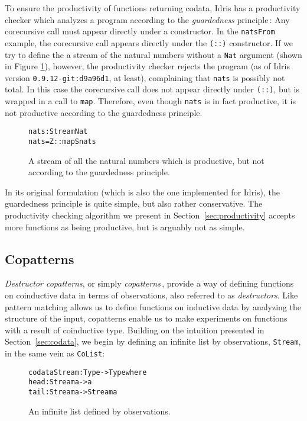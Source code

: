 To ensure the productivity of functions returning codata, Idris has a productivity checker which analyzes a program according to the \emph{guardedness} principle\,\citep{Coquand94,Gimenez95}: Any corecursive call must appear directly under a constructor. In the \texttt{natsFrom} example, the corecursive call appears directly under the \texttt{(::)} constructor. If we try to define the a stream of the natural numbers without a \texttt{Nat} argument (shown in Figure \ref{fig:nats}), however, the productivity checker rejects the program (as of Idris version \texttt{0.9.12-git:d9a96d1}, at least), complaining that \texttt{nats} is possibly not total. In this case the corecursive call does not appear directly under \texttt{(::)}, but is wrapped in a call to \texttt{map}. Therefore, even though \texttt{nats} is in fact productive, it is not productive according to the guardedness principle.

\begin{figure}
\begin{alltt}
nats : Stream Nat
nats = Z :: map S nats
\end{alltt}
\caption{A stream of all the natural numbers which is productive, but not according to the guardedness principle.}
\label{fig:nats}
\end{figure}

In its original formulation (which is also the one implemented for Idris), the guardedness principle is quite simple, but also rather conservative. The productivity checking algorithm we present in Section~\ref{sec:productivity} accepts more functions as being productive, but is arguably not as simple.

\subsection{Copatterns}
\emph{Destructor copatterns}, or simply \emph{copatterns}\,\citep{Abel13Copatterns}, provide a way of defining functions on coinductive data in terms of observations, also referred to as \emph{destructors}. Like pattern matching allows us to define functions on inductive data by analyzing the structure of the input, copatterns enable us to make experiments on functions with a result of coinductive type. Building on the intuition presented in Section~\ref{sec:codata}, we begin by defining an infinite list by observations, \texttt{Stream}, in the same vein as \texttt{CoList}:

\begin{figure}
\begin{alltt}
codata Stream : Type -> Type where
  head : Stream a -> a
  tail : Stream a -> Stream a 
\end{alltt}
\caption{An infinite list defined by observations.}
\label{fig:stream}
\end{figure}

